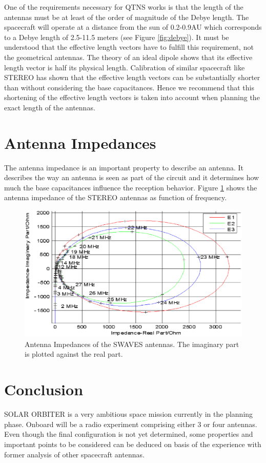 \documentclass[a4paper,twocolumn]{esapub2005} %
\begin{document}
One of the requirements necessary for QTNS works is that the length of the antennas must be at least of the order of magnitude of the Debye length. The spacecraft will operate at a distance from the sun of 0.2-0.9AU which corresponds to a Debye length of 2.5-11.5 meters (see Figure \ref{fig:debye}). It must be understood that the effective length vectors have to fulfill this requirement, not the geometrical antennas. The theory of an ideal dipole shows that its effective length vector is half its physical length. Calibration of similar spacecraft like STEREO has shown that the effective length vectors can be substantially shorter than without considering the base capacitances. Hence we recommend that this shortening of the effective length vectors is taken into account when planning the exact length of the antennas.

\section{Antenna Impedances}
The antenna impedance is an important property to describe an antenna. It describes the way an antenna is seen as part of the circuit and it determines how much the base capacitances influence the reception behavior.
Figure \ref{fig:imps} shows the antenna impedance of the STEREO antennas as function of frequency.

\begin{figure}
\centering
\includegraphics[width=1.0\linewidth]{paperpics/imps.eps}
\caption{Antenna Impedances of the SWAVES antennas. The imaginary part is plotted against the real part.} \label{fig:imps}
\end{figure}

\section{Conclusion}
SOLAR ORBITER is a very ambitious space mission currently in the planning phase. Onboard will be a radio experiment comprising either 3 or four antennas. Even though the final configuration is not yet determined, some properties and important points to be considered can be deduced on basis of the experience with former analysis of other spacecraft antennas.
\end{document}
